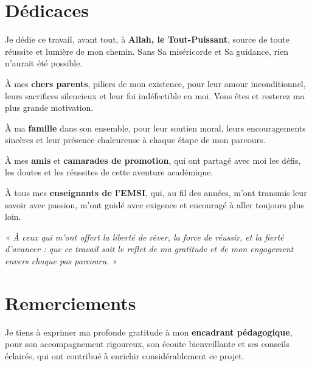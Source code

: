 \documentclass[12pt,a4paper,oneside]{report}
\begin{document}
\chapter*{Dédicaces}

\begin{center}
\itshape

Je dédie ce travail, avant tout, à \textbf{Allah, le Tout-Puissant}, source de toute réussite et lumière de mon chemin. Sans Sa miséricorde et Sa guidance, rien n'aurait été possible.

\vspace{0.5cm}
À mes \textbf{chers parents}, piliers de mon existence, pour leur amour inconditionnel, leurs sacrifices silencieux et leur foi indéfectible en moi. Vous êtes et resterez ma plus grande motivation.

\vspace{0.5cm}
À ma \textbf{famille} dans son ensemble, pour leur soutien moral, leurs encouragements sincères et leur présence chaleureuse à chaque étape de mon parcours.

\vspace{0.5cm}
À mes \textbf{amis} et \textbf{camarades de promotion}, qui ont partagé avec moi les défis, les doutes et les réussites de cette aventure académique.

\vspace{0.5cm}
À tous mes \textbf{enseignants de l'EMSI}, qui, au fil des années, m'ont transmis leur savoir avec passion, m'ont guidé avec exigence et encouragé à aller toujours plus loin.

\vspace{1cm}
\textit{« À ceux qui m'ont offert la liberté de rêver, la force de réussir, et la fierté d'avancer : que ce travail soit le reflet de ma gratitude et de mon engagement envers chaque pas parcouru. »}
\end{center}

\chapter*{Remerciements}

Je tiens à exprimer ma profonde gratitude à mon \textbf{encadrant pédagogique}, pour son accompagnement rigoureux, son écoute bienveillante et ses conseils éclairés, qui ont contribué à enrichir considérablement ce projet.
\end{document}
